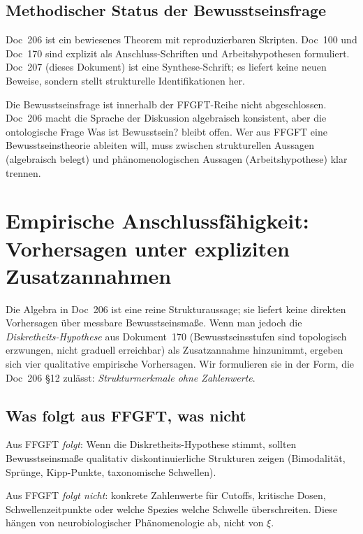 \subsection{Methodischer Status der Bewusstseinsfrage}

Doc~206 ist ein bewiesenes Theorem mit reproduzierbaren Skripten. Doc~100 und Doc~170 sind explizit als Anschluss-Schriften und Arbeitshypothesen formuliert. Doc~207 (dieses Dokument) ist eine Synthese-Schrift; es liefert keine neuen Beweise, sondern stellt strukturelle Identifikationen her.

\begin{interpretation}
Die Bewusstseinsfrage ist innerhalb der FFGFT-Reihe nicht abgeschlossen. Doc~206 macht die Sprache der Diskussion algebraisch konsistent, aber die ontologische Frage \glqq Was ist Bewusstsein?\grqq{} bleibt offen. Wer aus FFGFT eine Bewusstseinstheorie ableiten will, muss zwischen strukturellen Aussagen (algebraisch belegt) und phänomenologischen Aussagen (Arbeitshypothese) klar trennen.
\end{interpretation}

\section{Empirische Anschlussfähigkeit: Vorhersagen unter expliziten Zusatzannahmen}\label{sec:vorhersagen}

Die Algebra in Doc~206 ist eine reine Strukturaussage; sie liefert keine direkten Vorhersagen über messbare Bewusstseinsmaße. Wenn man jedoch die \emph{Diskretheits-Hypothese} aus Dokument~170 (Bewusstseinsstufen sind topologisch erzwungen, nicht graduell erreichbar) als Zusatzannahme hinzunimmt, ergeben sich vier qualitative empirische Vorhersagen. Wir formulieren sie in der Form, die Doc~206 \S12 zulässt: \emph{Strukturmerkmale ohne Zahlenwerte}.

\subsection{Was folgt aus FFGFT, was nicht}\label{sec:vorhersagen_folgt}

\begin{important}
Aus FFGFT \emph{folgt}: Wenn die Diskretheits-Hypothese stimmt, sollten Bewusstseinsmaße qualitativ diskontinuierliche Strukturen zeigen (Bimodalität, Sprünge, Kipp-Punkte, taxonomische Schwellen).

Aus FFGFT \emph{folgt nicht}: konkrete Zahlenwerte für Cutoffs, kritische Dosen, Schwellenzeitpunkte oder welche Spezies welche Schwelle überschreiten. Diese hängen von neurobiologischer Phänomenologie ab, nicht von $\xi$.
\end{important}

